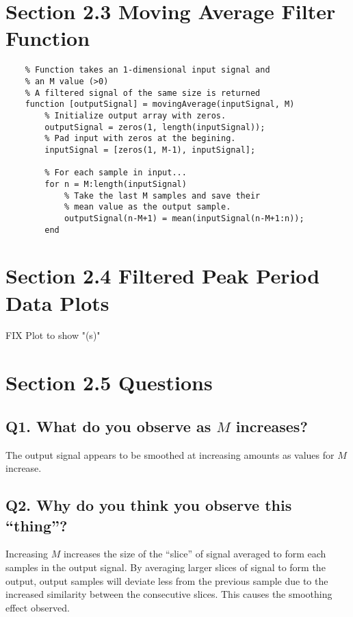 \documentclass[titlepage]{scrartcl}
\begin{document}
    \begin{figure}[H]
    \end{figure}

    \section*{Section 2.3 Moving Average Filter Function}
    \begin{lstlisting}
    % Function takes an 1-dimensional input signal and
    % an M value (>0) 
    % A filtered signal of the same size is returned
    function [outputSignal] = movingAverage(inputSignal, M)
        % Initialize output array with zeros.
        outputSignal = zeros(1, length(inputSignal));
        % Pad input with zeros at the begining.
        inputSignal = [zeros(1, M-1), inputSignal];

        % For each sample in input...
        for n = M:length(inputSignal)
            % Take the last M samples and save their
            % mean value as the output sample.
            outputSignal(n-M+1) = mean(inputSignal(n-M+1:n));
        end
    \end{lstlisting}

    \section*{Section 2.4 Filtered Peak Period Data Plots}
    FIX Plot to show "(s)"
    \begin{figure}[H]
    \end{figure}

    \section*{Section 2.5 Questions}
    \subsection*{Q1. What do you observe as $M$ increases?}
    The output signal appears to be smoothed at increasing
    amounts as values for $M$ increase.
    \subsection*{Q2. Why do you think you observe this ``thing''?}
    Increasing $M$ increases the size of the ``slice'' of
    signal averaged to form each samples in the output
    signal. By averaging larger slices of signal to form the
    output, output samples will deviate less from the
    previous sample due to the increased similarity between
    the consecutive slices. This causes the smoothing effect
    observed.
\end{document}
